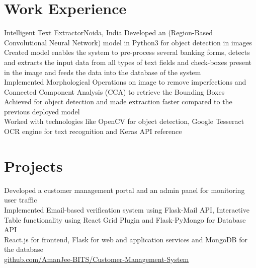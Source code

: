 \documentclass[]{barua-resume-openfont}
\begin{document}
\begin{minipage}[t]{0.67\textwidth}



\justify
\section{Work Experience}

{{Intelligent Text Extractor}}{Noida, India}
\descript{}
\textbullet{} Developed an 
{} 
(Region-Based Convolutional Neural Network) model in Python3 for object detection in images\\
\textbullet{} Created model enables the system to pre-process several banking forms, detects and extracts the input data from all types of text fields and check-boxes present in the image and feeds the data into the database of the system\\
\textbullet{} Implemented Morphological Operations on image to remove imperfections and Connected Component Analysis (CCA) to retrieve the Bounding Boxes\\
\textbullet{} Achieved 
{} 
for object detection and made extraction 
{}
faster compared to the previous deployed model\\
\textbullet{} Worked with technologies like OpenCV for object detection, Google Tesseract OCR engine for text recognition and Keras API reference\\

\sectionsep



\section{Projects}

\textbullet{} Developed a 
{} customer management portal and an admin panel for monitoring user traffic\\
\textbullet{} Implemented Email-based verification system using Flask-Mail API, Interactive Table functionality using React Grid Plugin and Flask-PyMongo for Database API\\
\textbullet{} 
{} React.js for frontend, Flask for web and application services and MongoDB for the database\\
\textbullet{} {\href{https://github.com/AmanJee-BITS/Customer-Management-System}{\faGithub \hspace{1pt} github.com/AmanJee-BITS/Customer-Management-System}}\\
\sectionsep
\bigskip


\end{minipage}
\end{document}
